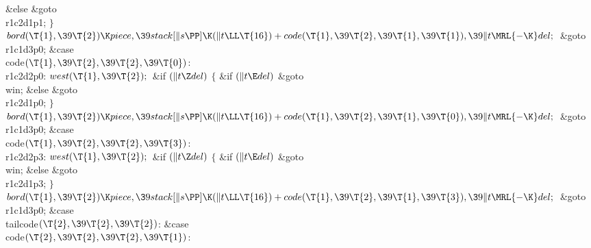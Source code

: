 \2\&{else}\1\5
\&{goto} \\{r1c2d1p1};\5
\2${}\}{}$\2\6
${}\\{bord}(\T{1},\39\T{2})\K\\{piece},\39\\{stack}[\|s\PP]\K(\|t\LL\T{16})+%
\\{code}(\T{1},\39\T{2},\39\T{1},\39\T{1}),\39\|t\MRL{-{\K}}\\{del};{}$\6
\&{goto} \\{r1c1d3p0};\6
\4\&{case} \\{code}${}(\T{1},\39\T{2},\39\T{2},\39\T{0}){}$:\5
\\{r1c2d2p0}:\5
${}\\{west}(\T{1},\39\T{2});{}$\6
\&{if} ${}(\|t\Z\\{del}){}$\5
${}\{{}$\5
\1\&{if} ${}(\|t\E\\{del}){}$\1\5
\&{goto} \\{win};\5
\2\&{else}\1\5
\&{goto} \\{r1c2d1p0};\5
\2${}\}{}$\2\6
${}\\{bord}(\T{1},\39\T{2})\K\\{piece},\39\\{stack}[\|s\PP]\K(\|t\LL\T{16})+%
\\{code}(\T{1},\39\T{2},\39\T{1},\39\T{0}),\39\|t\MRL{-{\K}}\\{del};{}$\6
\&{goto} \\{r1c1d3p0};\6
\4\&{case} \\{code}${}(\T{1},\39\T{2},\39\T{2},\39\T{3}){}$:\5
\\{r1c2d2p3}:\5
${}\\{west}(\T{1},\39\T{2});{}$\6
\&{if} ${}(\|t\Z\\{del}){}$\5
${}\{{}$\5
\1\&{if} ${}(\|t\E\\{del}){}$\1\5
\&{goto} \\{win};\5
\2\&{else}\1\5
\&{goto} \\{r1c2d1p3};\5
\2${}\}{}$\2\6
${}\\{bord}(\T{1},\39\T{2})\K\\{piece},\39\\{stack}[\|s\PP]\K(\|t\LL\T{16})+%
\\{code}(\T{1},\39\T{2},\39\T{1},\39\T{3}),\39\|t\MRL{-{\K}}\\{del};{}$\6
\&{goto} \\{r1c1d3p0};\6
\4\&{case} \\{tailcode}${}(\T{2},\39\T{2},\39\T{2}){}$:\5
\&{case} \\{code}${}(\T{2},\39\T{2},\39\T{2},\39\T{1}){}$:\5
